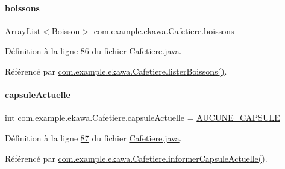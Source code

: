 \mbox{\label{classcom_1_1example_1_1ekawa_1_1_cafetiere_aad375efbc01f1db83572f4ae567189de}} 
\paragraph{\texorpdfstring{boissons}{boissons}}
{\footnotesize\ttfamily Array\+List$<$\hyperlink{classcom_1_1example_1_1ekawa_1_1_boisson}{Boisson}$>$ com.\+example.\+ekawa.\+Cafetiere.\+boissons\hspace{0.3cm}{\ttfamily [private]}}



Définition à la ligne \hyperlink{_cafetiere_8java_source_l00086}{86} du fichier \hyperlink{_cafetiere_8java_source}{Cafetiere.\+java}.



Référencé par \hyperlink{_cafetiere_8java_source_l00193}{com.\+example.\+ekawa.\+Cafetiere.\+lister\+Boissons()}.

\mbox{\label{classcom_1_1example_1_1ekawa_1_1_cafetiere_ac8fa3d1ad76eccf431ee04b395a557a3}} 
\paragraph{\texorpdfstring{capsule\+Actuelle}{capsuleActuelle}}
{\footnotesize\ttfamily int com.\+example.\+ekawa.\+Cafetiere.\+capsule\+Actuelle = \hyperlink{classcom_1_1example_1_1ekawa_1_1_cafetiere_a5a23a636fa5f2e5826458e700f453c16}{A\+U\+C\+U\+N\+E\+\_\+\+C\+A\+P\+S\+U\+LE}\hspace{0.3cm}{\ttfamily [private]}}



Définition à la ligne \hyperlink{_cafetiere_8java_source_l00087}{87} du fichier \hyperlink{_cafetiere_8java_source}{Cafetiere.\+java}.



Référencé par \hyperlink{_cafetiere_8java_source_l00235}{com.\+example.\+ekawa.\+Cafetiere.\+informer\+Capsule\+Actuelle()}.

